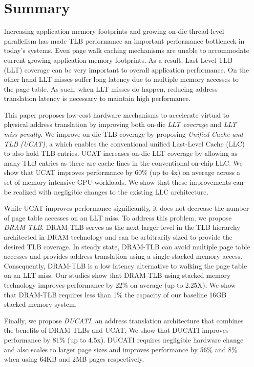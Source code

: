 \section{Summary}

\noindent Increasing application memory footprints and growing
on-die thread-level parallelism has made TLB performance an
important performance bottleneck in today's systems. Even page walk caching
mechanisms are unable to accommodate current growing application memory
footprints. As a result, Last-Level TLB (LLT) coverage can be very important
to overall application performance. On the other hand LLT misses suffer long
latency due to multiple memory accesses to the page table. As such, when LLT
misses do happen, reducing address translation latency is necessary to maintain
high performance.

This paper proposes low-cost hardware mechanisms to accelerate virtual to physical address translation by improving both on-die {\em LLT coverage} and {\em LLT miss penalty}. 
We improve on-die TLB coverage by proposing {\em Unified Cache and TLB (UCAT)}, a
which enables the conventional unified Last-Level
Cache (LLC) to also hold TLB entries. UCAT increases on-die LLT
coverage by allowing as many TLB entries as there are cache lines in
the conventional on-chip LLC. We show that UCAT improves performance
by 60\% (up to 4x) on average across a set of memory intensive GPU
workloads. We show that these improvements can be realized with
negligible changes to the existing LLC architecture.


While UCAT improves performance significantly, it does not decrease the number of
page table accesses on an LLT miss. To address this problem, we
propose {\em DRAM-TLB}. DRAM-TLB
serves as the next larger level in the TLB hierarchy architected in
DRAM technology and can be arbitrarily sized to provide the desired
TLB coverage. In steady state, DRAM-TLB can avoid multiple page table
accesses and provides address translation using a single stacked
memory access. Consequently, DRAM-TLB is a low latency alternative to
walking the page table on an LLT miss. Our studies show that DRAM-TLB
using stacked memory technology improves
performance by 22\% on average (up to 2.25X). We show that DRAM-TLB
requires less than 1\% the capacity of our baseline 16GB stacked
memory system.

Finally, we propose {\em DUCATI}, an address translation architecture
that combines the benefits of DRAM-TLBs and UCAT. We show that DUCATI
improves performance by 81\% (up to 4.5x). DUCATI
requires negligible hardware change and also scales to larger page
sizes and improves performance by 56\% and 8\% when using 64KB and 2MB
pages respectively.

% 
